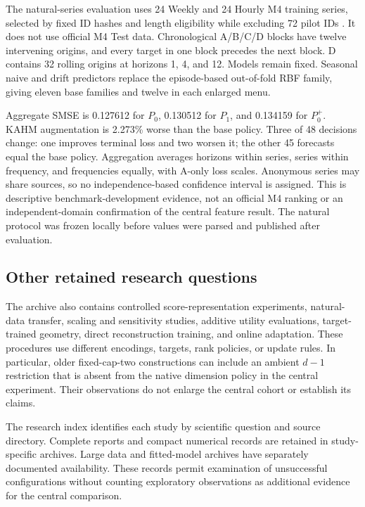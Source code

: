 \begin{table}[htbp]\centering\small
\caption{Complete four-comparison policy-augmentation family. Upper endpoints use candidate minus margin-adjusted reference loss in absolute SMSE units; negative endpoints establish the criterion.}\label{supp:policy}
\end{table}
\FloatBarrier

The natural-series evaluation uses 24 Weekly and 24 Hourly M4 training series, selected by fixed ID hashes and length eligibility while excluding 72 pilot IDs \citep{M4DataSnapshot2026}. It does not use official M4 Test data. Chronological A/B/C/D blocks have twelve intervening origins, and every target in one block precedes the next block. D contains 32 rolling origins at horizons 1, 4, and 12. Models remain fixed. Seasonal naive and drift predictors replace the episode-based out-of-fold RBF family, giving eleven base families and twelve in each enlarged menu.

Aggregate SMSE is 0.127612 for $P_0$, 0.130512 for $P_1$, and 0.134159 for $P_0^+$. KAHM augmentation is 2.273\% worse than the base policy. Three of 48 decisions change: one improves terminal loss and two worsen it; the other 45 forecasts equal the base policy. Aggregation averages horizons within series, series within frequency, and frequencies equally, with A-only loss scales. Anonymous series may share sources, so no independence-based confidence interval is assigned. This is descriptive benchmark-development evidence, not an official M4 ranking or an independent-domain confirmation of the central feature result. The natural protocol was frozen locally before values were parsed and published after evaluation.

\subsection{Other retained research questions}
The archive also contains controlled score-representation experiments, natural-data transfer, scaling and sensitivity studies, additive utility evaluations, target-trained geometry, direct reconstruction training, and online adaptation. These procedures use different encodings, targets, rank policies, or update rules. In particular, older fixed-cap-two constructions can include an ambient $d-1$ restriction that is absent from the native dimension policy in the central experiment. Their observations do not enlarge the central cohort or establish its claims.

The research index identifies each study by scientific question and source directory. Complete reports and compact numerical records are retained in study-specific archives. Large data and fitted-model archives have separately documented availability. These records permit examination of unsuccessful configurations without counting exploratory observations as additional evidence for the central comparison.
